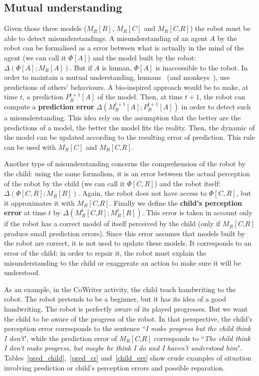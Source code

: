 \documentclass[10pt,a4paper]{article}
\begin{document}
\subsection{Mutual understanding}\label{mu}
Given those three models ($ M_R\left[\textit{R}\right]$, $ M_R\left[\textit{C}\right]$ and $ M_R\left[\textit{C,R}\right]$) the robot must be able to detect misunderstandings. 
A misunderstanding of an agent $A$ by the robot can be formalised as a error between what is actually in the mind of the agent (we can call it $\Phi[A]$) and the model built by the robot: $\Delta \left(\Phi[A] ; M_R\left[\textit{A}\right]\right)$. But if $A$ is human, $\Phi[A]$ is inaccessible to the robot. In order to maintain a mutual understanding, humans~\cite{suzuki2015neural} (and monkeys~\cite{haroush2015neuronal}), use predictions of others' behaviours. A bio-inspired approach would be to make, at time $t$, a prediction $P^{t+1}_R\left[\textit{A}\right]$ of the model. Then, at time $t+1$, the robot can compute a \textbf{prediction error} $\Delta \left( M^{t+1}_R\left[\textit{A}\right]; P^{t+1}_R\left[\textit{A}\right]\right)$ in order to detect such a misunderstanding. This idea rely on the assumption that the better are the predictions of a model, the better the model fits the reality. Then, the dynamic of the model can be updated according to the resulting error of prediction. This rule can be used with $ M_R\left[\textit{C}\right]$ and $ M_R\left[\textit{C,R}\right]$. 

Another type of misunderstanding concerns the comprehension of the robot by the child: using the same formalism, it is an error between the actual perception of the robot by the child (we can call it $\Phi[C,R]$) and the robot itself: $\Delta \left(\Phi[C,R] ; M_R\left[\textit{R}\right]\right)$. Again, the robot does not have access to $\Phi[C,R]$, but it approximates it with $ M_R\left[\textit{C,R}\right]$. Finally we define the \textbf{child's perception error} at time $t$ by $\Delta \left(M^t_R\left[\textit{C,R}\right] ; M^t_R\left[\textit{R}\right]\right)$. This error is taken in account only if the robot has a correct model of itself perceived by the child (only if $M_R\left[\textit{C,R}\right]$ produce small prediction errors). Since this error assumes that models built by the robot are correct, it is not used to update these models. It corresponds to an error of the child: in order to repair it, the robot must explain the misunderstanding to the child or exaggerate an action to make sure it will be understood.

As an example, in the CoWriter activity, the child teach handwriting to the robot. The robot pretends to be a beginner, but it has its idea of a good handwriting. The robot is perfectly aware of its played progresses. But we want the child to be aware of the progress of the robot. In that perspective, the child's perception error corresponds to the sentence ``\textit{I make progress but the child think I don't}", while the prediction error of $M_R\left[\textit{C,R}\right]$ corresponds to ``\textit{The child think I don't make progress, but maybe he think I do and I haven't understood him}". Tables~\ref{pred_child},~\ref{pred_cr} and~\ref{child_err} show crude examples of situation involving prediction or child's perception errors and possible reparation.
\end{document}
